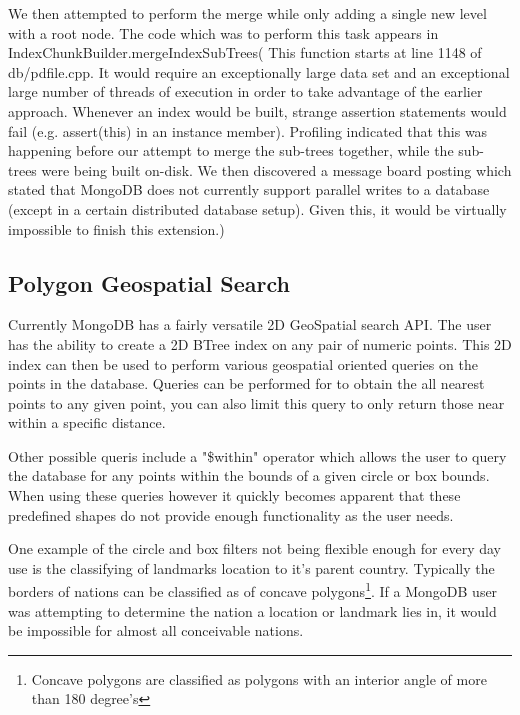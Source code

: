 \documentclass{../dependencies/acm_proc_article-sp}
\begin{document}
We then attempted to perform the merge while only adding a single new level with a root node.
The code which was to perform this task appears in IndexChunkBuilder.mergeIndexSubTrees( This function starts at line 1148 of db/pdfile.cpp.
It would require an exceptionally large data set and an exceptional large number of threads of execution in order to take advantage of the earlier approach.
Whenever an index would be built, strange assertion statements would fail (e.g. assert(this) in an instance member).
Profiling indicated that this was happening before our attempt to merge the sub-trees together, while the sub-trees were being built on-disk.
We then discovered a message board posting which stated that MongoDB does not currently support parallel writes to a database\cite{2} (except in a certain distributed database setup)\cite{3}.
Given this, it would be virtually impossible to finish this extension.)

\subsection{Polygon Geospatial Search}
Currently MongoDB has a fairly versatile 2D GeoSpatial search API.
The user has the ability to create a 2D BTree index on any pair of numeric points.
This 2D index can then be used to perform various geospatial oriented queries on the 
points in the database. Queries can be performed for to obtain the all nearest points
to any given point, you can also limit this query to only return those near within a specific distance.

Other possible queris include a "\$within" operator which allows the user to query the database
for any points within the bounds of a given circle or box bounds. When using these queries however it
quickly becomes apparent that these predefined shapes do not provide enough functionality as the user needs.

One example of the circle and box filters not being flexible enough for every day use is the classifying of
landmarks location to it's parent country. Typically the borders of nations can be classified as of concave polygons\footnote{Concave polygons are classified as polygons with an interior angle of more than 180 degree's}.
If a MongoDB user was attempting to determine the nation a location or landmark lies in, it would be impossible for almost
all conceivable nations. 
\end{document}
